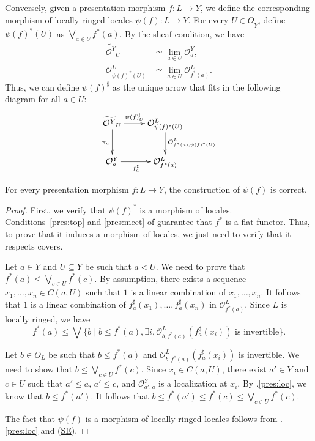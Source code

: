 \documentclass[reqno]{amsart}
\newcommand{\axref}[1]{(\hyperref[ax:#1]{#1})}
\theoremstyle{definition}
\theoremstyle{remark}
\numberwithin{figure}{section}
\newcommand{\cover}{\triangleleft}
\begin{document}
Conversely, given a presentation morphism $f : L \to Y$, we define the corresponding morphism of locally ringed locales $\psi(f) : L \to \widetilde{Y}$.
For every $U \in O_{\widetilde{Y}}$, define $\psi(f)^*(U)$ as $\bigvee_{a \in U} f^*(a)$.
By the sheaf condition, we have
\begin{align*}
\widetilde{\mathcal{O}^Y}_U & \simeq \lim_{a \in U} \mathcal{O}^Y_a, \\
\mathcal{O}^L_{\psi(f)^*(U)} & \simeq \lim_{a \in U} \mathcal{O}^L_{f^*(a)}.
\end{align*}
Thus, we can define $\psi(f)^\sharp$ as the unique arrow that fits in the following diagram for all $a \in U$:
\[ \xymatrix{ \widetilde{\mathcal{O}^Y}_U \ar[r]^-{\psi(f)^\sharp_U} \ar[d]_{\pi_a} & \mathcal{O}^L_{\psi(f)^*(U)} \ar[d]^{\mathcal{O}^L_{f^*(a),\psi(f)^*(U)}} \\
              \mathcal{O}^Y_a \ar[r]_-{f^\sharp_a}                                  & \mathcal{O}^L_{f^*(a)}
            } \]

\begin{lem}
For every presentation morphism $f : L \to Y$, the construction of $\psi(f)$ is correct.
\end{lem}
\begin{proof}
First, we verify that $\psi(f)^*$ is a morphism of locales.
Conditions~\eqref{pres:top} and \eqref{pres:meet} of  guarantee that $f^*$ is a flat functor.
Thus, to prove that it induces a morphism of locales, we just need to verify that it respects covers.

Let $a \in Y$ and $U \subseteq Y$ be such that $a \cover U$.
We need to prove that $f^*(a) \leq \bigvee_{c \in U} f^*(c)$.
By assumption, there exists a sequence $x_1, \ldots, x_n \in C(a,U)$ such that $1$ is a linear combination of $x_1, \ldots, x_n$.
It follows that $1$ is a linear combination of $f^\sharp_a(x_1), \ldots, f^\sharp_a(x_n)$ in $\mathcal{O}^L_{f^*(a)}$.
Since $L$ is locally ringed, we have
\[ f^*(a) \leq \bigvee \{ b \mid b \leq f^*(a), \exists i, \mathcal{O}^L_{b,f^*(a)}(f^\sharp_a(x_i)) \text{ is invertible} \}. \]

Let $b \in O_L$ be such that $b \leq f^*(a)$ and $\mathcal{O}^L_{b,f^*(a)}(f^\sharp_a(x_i))$ is invertible.
We need to show that $b \leq \bigvee_{c \in U} f^*(c)$.
Since $x_i \in C(a,U)$, there exist $a' \in Y$ and $c \in U$ such that $a' \leq a$, $a' \leq c$, and $\mathcal{O}^Y_{a',a}$ is a localization at $x_i$.
By .\eqref{pres:loc}, we know that $b \leq f^*(a')$.
It follows that $b \leq f^*(a') \leq f^*(c) \leq \bigvee_{c \in U} f^*(c)$.

The fact that $\psi(f)$ is a morphism of locally ringed locales follows from .\eqref{pres:loc} and \axref{SE}.
\end{proof}
\end{document}
